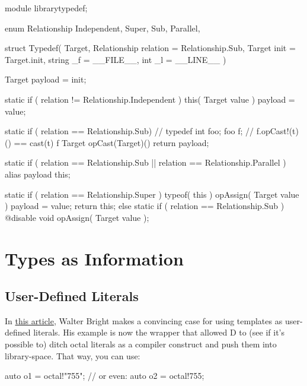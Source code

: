 \begin{dcode}
module librarytypedef;

enum Relationship
{
    Independent,
    Super,
    Sub,
    Parallel,
}

struct Typedef( Target, 
                Relationship relation = Relationship.Sub, 
                Target init = Target.init, 
                string _f = __FILE__,
                int _l = __LINE__ )
{
    Target payload = init;

    static if ( relation != Relationship.Independent )
        this( Target value )
        {
            payload = value;
        }

    static if ( relation == Relationship.Sub)
        // typedef int foo; foo f;
        // f.opCast!(t)() == cast(t) f
        Target opCast(Target)()
        {
            return payload;
        }

    static if ( relation == Relationship.Sub 
             || relation == Relationship.Parallel )
        alias payload this;

    static if ( relation == Relationship.Super )
        typeof( this ) opAssign( Target value )
        {
            payload = value;
            return this;
        }
    else static if ( relation == Relationship.Sub )
        @disable void opAssign( Target value );
}
\end{dcode}


\section{Types as Information}
\label{typesasinformation}

\subsection{User-Defined Literals}\label{userdefinedliterals}

In \href{http://drdobbs.com/blogs/tools/229401068}{this article}, Walter Bright makes a convincing case for using templates as user-defined literals. His example is now the  wrapper that allowed D to (see if it's possible to) ditch octal literals as a compiler construct and push them into library-space. That way, you can use:

\begin{dcode}
auto o1 = octal!"755";
// or even:
auto o2 = octal!755;
\end{dcode}

